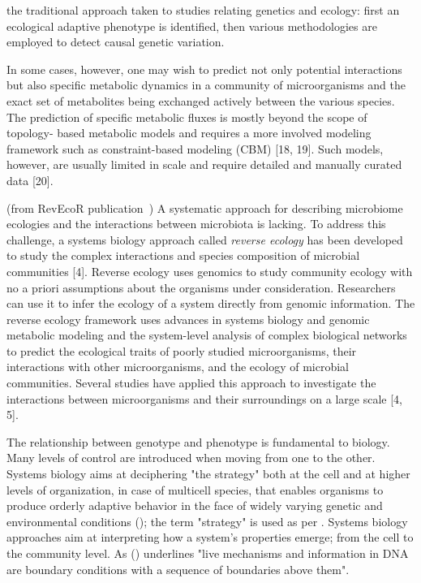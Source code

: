       the traditional approach taken to studies relating genetics and ecology:
      first an ecological adaptive phenotype is identified, then various methodologies are
      employed to detect causal genetic variation.






      In some cases, however, one may wish to predict not only potential interactions
      but also specific metabolic dynamics in a community of microorganisms and the
      exact set of metabolites being exchanged actively between the various species. The
      prediction of specific metabolic fluxes is mostly beyond the scope of topology-
      based metabolic models and requires a more involved modeling framework such
      as constraint-based modeling (CBM) [18, 19]. Such models, however, are usually
      limited in scale and require detailed and manually curated data [20].







      (from RevEcoR publication~\cite{cao2016revecor})
      A systematic approach for describing microbiome ecologies and the interactions between microbiota is lacking. 
      To address this challenge, a systems biology approach called \textit{reverse ecology} has been developed 
      to study the complex interactions and species composition of microbial communities [4]. 
      Reverse ecology uses genomics to study community ecology with no a priori assumptions about the organisms under consideration. 
      Researchers can use it to infer the ecology of a system directly from genomic information. 
      The reverse ecology framework uses advances in systems biology and genomic metabolic modeling and 
      the system-level analysis of complex biological networks to predict the ecological traits of poorly studied microorganisms, 
      their interactions with other microorganisms, and the ecology of microbial communities. 
      Several studies have applied this approach to investigate the interactions between microorganisms 
      and their surroundings on a large scale [4, 5].

      The relationship between genotype and phenotype is fundamental to biology.
      Many levels of control are introduced when moving from one to the other. 
      Systems biology aims at deciphering "the strategy" both at the cell and at higher levels of organization, in case of multicell species, that enables organisms to produce orderly adaptive behavior in the face of widely varying genetic and environmental conditions (\cite{strohman2002maneuvering}); 
      the term "strategy" is used as per \cite{polanyi1968life}.
      Systems biology approaches aim at interpreting how a system's properties emerge; 
      from the cell to the community level.
      As \citeauthor{polanyi1968life} (\citeyear{polanyi1968life}) underlines 
      "live mechanisms and information in DNA are boundary conditions with a sequence of boundaries above them". 




